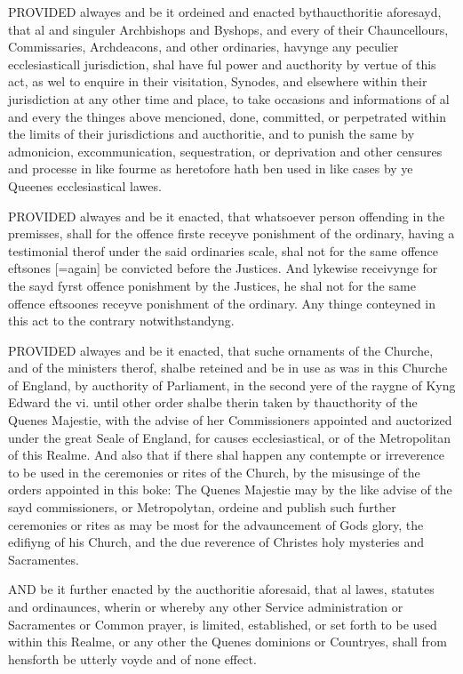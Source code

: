 PROVIDED alwayes and be it
ordeined and enacted bythaucthoritie aforesayd, that al and singuler
Archbishops and Byshops, and every of their Chauncellours, Commissaries,
Archdeacons, and other ordinaries, havynge any peculier ecclesiasticall
jurisdiction, shal have ful power and aucthority by vertue of this act,
as wel to enquire in their visitation, Synodes, and elsewhere within
their jurisdiction at any other time and place, to take occasions and
informations of al and every the thinges above mencioned, done, committed,
or perpetrated within the limits of their jurisdictions and aucthoritie,
and to punish the same by admonicion, excommunication, sequestration,
or deprivation and other censures and processe in like fourme as heretofore
hath ben used in like cases by ye Queenes ecclesiastical lawes.

PROVIDED alwayes and be it
enacted, that whatsoever person offending in the premisses, shall for
the offence firste receyve ponishment of the ordinary, having a testimonial
therof under the said ordinaries scale, shal not for the same offence
eftsones [=again] be convicted
before the Justices. And lykewise receivynge for the sayd fyrst offence
ponishment by the Justices, he shal not for the same offence eftsoones
receyve ponishment of the ordinary. Any thinge conteyned in this act
to the contrary notwithstandyng.

PROVIDED alwayes and be it
enacted, that suche ornaments of the Churche, and of the ministers therof,
shalbe reteined and be in use as was in this Churche of England, by
aucthority of Parliament, in the second yere of the raygne of Kyng Edward
the vi. until other order shalbe therin taken by thaucthority of the
Quenes Majestie, with the advise of her Commissioners appointed and
auctorized under the great Seale of England, for causes ecclesiastical,
or of the Metropolitan of this Realme. And also that if there shal happen
any contempte or irreverence to be used in the ceremonies or rites of
the Church, by the misusinge of the orders appointed in this boke: The
Quenes Majestie may by the like advise of the sayd commissioners, or
Metropolytan, ordeine and publish such further ceremonies or rites as
may be most for the advauncement of Gods glory, the edifiyng of his
Church, and the due reverence of Christes holy mysteries and Sacramentes.

AND be it further enacted
by the aucthoritie aforesaid, that al lawes, statutes and ordinaunces,
wherin or whereby any other Service administration or Sacramentes or
Common prayer, is limited, established, or set forth to be used within
this Realme, or any other the Quenes dominions or Countryes, shall from
hensforth be utterly voyde and of none effect.

